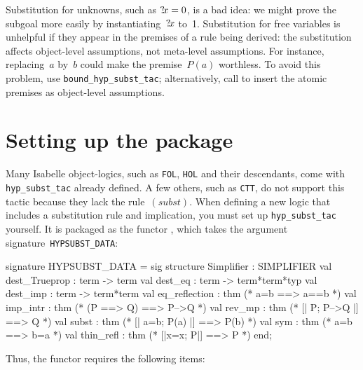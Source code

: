 Substitution for unknowns, such as ${?\!x}=0$, is a bad idea: we might prove
the subgoal more easily by instantiating~${?\!x}$ to~1.
Substitution for free variables is unhelpful if they appear in the
premises of a rule being derived: the substitution affects object-level
assumptions, not meta-level assumptions.  For instance, replacing~$a$
by~$b$ could make the premise~$P(a)$ worthless.  To avoid this problem, use
\texttt{bound_hyp_subst_tac}; alternatively, call  to
insert the atomic premises as object-level assumptions.


\section{Setting up the package} 
Many Isabelle object-logics, such as \texttt{FOL}, \texttt{HOL} and their
descendants, come with \texttt{hyp_subst_tac} already defined.  A few others,
such as \texttt{CTT}, do not support this tactic because they lack the
rule~$(subst)$.  When defining a new logic that includes a substitution
rule and implication, you must set up \texttt{hyp_subst_tac} yourself.  It
is packaged as the \ML{} functor , which takes the
argument signature~\texttt{HYPSUBST_DATA}:
\begin{ttbox} 
signature HYPSUBST_DATA =
  sig
  structure Simplifier : SIMPLIFIER
  val dest_Trueprop    : term -> term
  val dest_eq          : term -> term*term*typ
  val dest_imp         : term -> term*term
  val eq_reflection    : thm             (* a=b ==> a==b *)
  val imp_intr         : thm             (* (P ==> Q) ==> P-->Q *)
  val rev_mp           : thm             (* [| P;  P-->Q |] ==> Q *)
  val subst            : thm             (* [| a=b;  P(a) |] ==> P(b) *)
  val sym              : thm             (* a=b ==> b=a *)
  val thin_refl        : thm             (* [|x=x; P|] ==> P *)
  end;
\end{ttbox}
Thus, the functor requires the following items:
